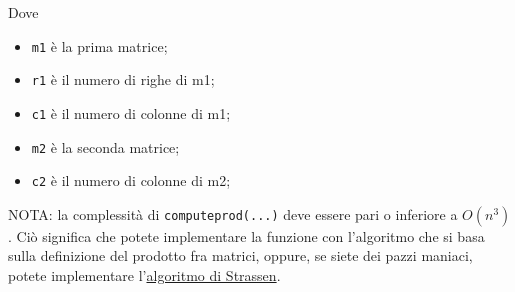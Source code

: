 \documentclass{article}
\begin{document}
Dove 
\begin{itemize}
    \item \texttt{m1} è la prima matrice;
    \item \texttt{r1} è il numero di righe di m1;
    \item \texttt{c1} è il numero di colonne di m1;
    \item \texttt{m2} è la seconda matrice;
    \item \texttt{c2} è il numero di colonne di m2;
\end{itemize}
NOTA: la complessità di \texttt{compute\textunderscore prod(...)} deve essere pari o inferiore a $O(n^3)$. Ciò significa che potete implementare la funzione con l'algoritmo che si basa sulla definizione del prodotto fra matrici, oppure, se siete dei pazzi maniaci, potete implementare l'\color{blue}\href{https://it.wikipedia.org/wiki/Algoritmo_di_Strassen}{algoritmo di Strassen}\color{black}.
\end{document}
